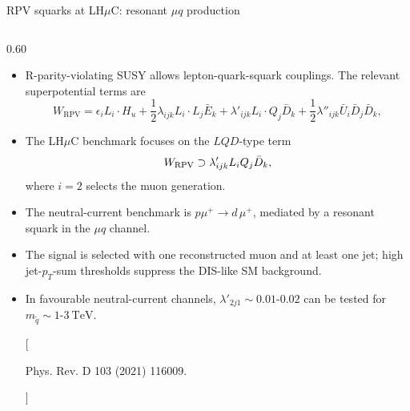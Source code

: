 \documentclass[aspectratio=1610,english]{beamer}
\newcommand{\LHCmu}{LH$\mu$C}
\begin{document}
\begin{frame}{RPV squarks at \texorpdfstring{\LHCmu{}}{LHmuC}: resonant \(\mu q\) production}
	
\begin{columns}[T]%
		
\begin{column}{0.60\textwidth}
			
\vspace{-0.5em}
			
\begin{itemize}
\scriptsize
\justifying
\item R-parity-violating SUSY allows lepton-quark-squark couplings.  The relevant superpotential terms are
				\[
				W_{\text{RPV}} =\epsilon_i L_i\cdot H_u + \frac{1}{2}\lambda_{ijk}L_i\cdot L_j \bar{E}_k + \lambda'_{ijk} L_i\cdot Q_j \bar{D}_k + \frac{1}{2}\lambda''_{ijk} \bar{U}_i \bar{D}_j \bar{D}_k,
				\]
\item The LH\(\mu\)C benchmark focuses on the \(LQD\)-type term
				\[
				W_{\rm RPV}\supset \lambda'_{ijk}L_iQ_j\bar D_k ,
				\]
where \(i=2\) selects the muon generation.
\end{itemize}
			
\vspace{0.15em}
			
\begin{itemize}
\scriptsize
\justifying
\item The neutral-current benchmark is $p\mu^+ \to d\,\mu^+$, mediated by a resonant squark in the \(\mu q\) channel.
				
\item The signal is selected with one reconstructed muon and at least one jet; high jet-\(p_T\)-sum thresholds suppress the DIS-like SM background.
				
\item In favourable neutral-current channels, \(\lambda'_{2j1}\sim0.01\text{-}0.02\)
can be tested for \(m_{\tilde q}\sim1\text{-}3~\mathrm{TeV}\).
				
[{\centering
\tiny
{\setlength{\fboxsep}{4pt}\colorbox{magenta!10}{\strut Phys. Rev. D 103 (2021) 116009.}}}]
\end{itemize}
			

\end{column}
\end{columns}
\end{frame}
\end{document}
